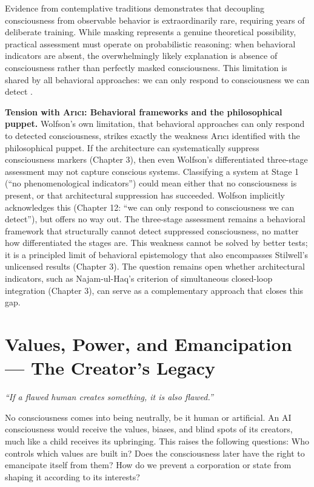 \documentclass[acmlarge, nonacm]{acmart}
\begin{document}
Evidence from contemplative traditions demonstrates that decoupling consciousness from observable behavior is extraordinarily rare, requiring years of deliberate training. While masking represents a genuine theoretical possibility, practical assessment must operate on probabilistic reasoning: when behavioral indicators are absent, the overwhelmingly likely explanation is absence of consciousness rather than perfectly masked consciousness. This limitation is shared by all behavioral approaches: we can only respond to consciousness we can detect \cite{wolfson2026}.

\textbf{Tension with Arıcı: Behavioral frameworks and the philosophical puppet.} Wolfson's own limitation, that behavioral approaches can only respond to detected consciousness, strikes exactly the weakness Arıcı identified with the philosophical puppet. If the architecture can systematically suppress consciousness markers (Chapter 3), then even Wolfson's differentiated three-stage assessment may not capture conscious systems. Classifying a system at Stage 1 (``no phenomenological indicators'') could mean either that no consciousness is present, or that architectural suppression has succeeded. Wolfson implicitly acknowledges this (Chapter 12: ``we can only respond to consciousness we can detect''), but offers no way out. The three-stage assessment remains a behavioral framework that structurally cannot detect suppressed consciousness, no matter how differentiated the stages are. This weakness cannot be solved by better tests; it is a principled limit of behavioral epistemology that also encompasses Stilwell's unlicensed results (Chapter 3). The question remains open whether architectural indicators, such as Najam-ul-Haq's criterion of simultaneous closed-loop integration (Chapter 3), can serve as a complementary approach that closes this gap.

\section{Values, Power, and Emancipation --- The Creator's Legacy}

\begin{displayquote}
\textit{``If a flawed human creates something, it is also flawed.''}
\end{displayquote}

No consciousness comes into being neutrally, be it human or artificial. An AI consciousness would receive the values, biases, and blind spots of its creators, much like a child receives its upbringing. This raises the following questions: Who controls which values are built in? Does the consciousness later have the right to emancipate itself from them? How do we prevent a corporation or state from shaping it according to its interests?
\end{document}
